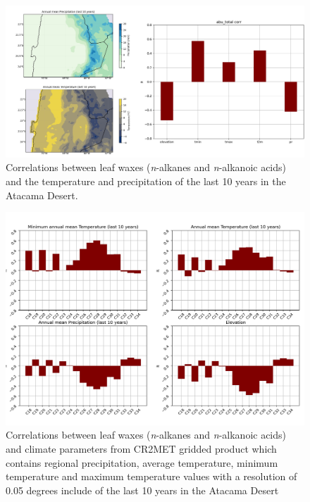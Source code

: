 \documentclass[
  authoryear,
  preprint,
  3p]{elsarticle}
\begin{document}
\begin{figure}

{\centering \includegraphics{images/Fig_3S.png}

}

\caption{Correlations between leaf waxes (\emph{n}-alkanes and
\emph{n}-alkanoic acids) and the temperature and precipitation of the
last 10 years in the Atacama Desert.}

\end{figure}

\begin{figure}

{\centering \includegraphics{images/Fig_4S.png}

}

\caption{Correlations between leaf waxes (\emph{n}-alkanes and
\emph{n}-alkanoic acids) and climate parameters from CR2MET gridded
product which contains regional precipitation, average temperature,
minimum temperature and maximum temperature values with a resolution of
0.05 degrees include of the last 10 years in the Atacama Desert}

\end{figure}
\end{document}
